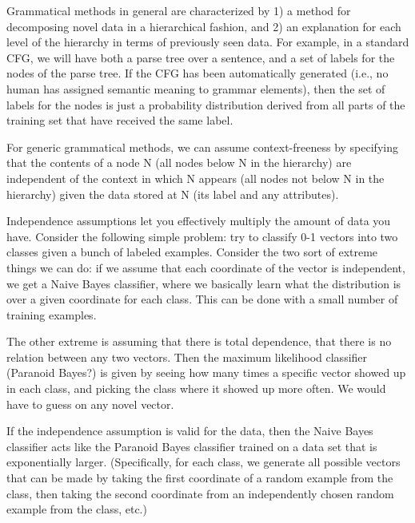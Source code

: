 \begin{rem}
Grammatical methods in general are characterized by 1) a method for
decomposing novel data in a hierarchical fashion, and 2) an
explanation for each level of the hierarchy in terms of previously
seen data. For example, in a standard CFG, we will have both a parse
tree over a sentence, and a set of labels for the nodes of the parse
tree. If the CFG has been automatically generated (i.e., no human has
assigned semantic meaning to grammar elements), then the set of labels
for the nodes is just a probability distribution derived from all
parts of the training set that have received the same label. 

For generic grammatical methods, we can assume context-freeness by
specifying that the contents of a node N (all nodes below N in the
hierarchy) are independent of the context in which N appears (all
nodes not below N in the hierarchy) given the data stored at N (its
label and any attributes).
\end{rem}

\begin{rem}
  Independence assumptions let you effectively multiply the amount of
  data you have. Consider the following simple problem: try to
  classify 0-1 vectors into two classes given a bunch of labeled
  examples. Consider the two sort of extreme things we can do: if we
  assume that each coordinate of the vector is independent, we get a
  Naive Bayes classifier, where we basically learn what the
  distribution is over a given coordinate for each class. This can be
  done with a small number of training examples.

  The other extreme is assuming that there is total dependence, that
  there is no relation between any two vectors. Then the maximum
  likelihood classifier (Paranoid Bayes?) is given by seeing how many
  times a specific vector showed up in each class, and picking the
  class where it showed up more often. We would have to guess on any
  novel vector.  

  If the independence assumption is valid for the data, then the Naive
  Bayes classifier acts like the Paranoid Bayes classifier trained on
  a data set that is exponentially larger. (Specifically, for each
  class, we generate all possible vectors that can be made by taking
  the first coordinate of a random example from the class, then taking
  the second coordinate from an independently chosen random example
  from the class, etc.)
\end{rem}

